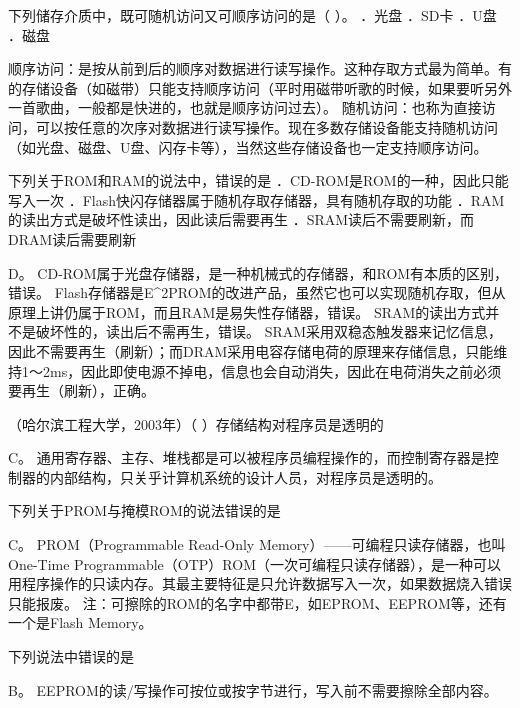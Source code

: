\question 下列储存介质中，既可随机访问又可顺序访问的是（ ）。 ．光盘 ．SD卡
．U盘 ．磁盘
\par{}
\begin{solution}顺序访问：是按从前到后的顺序对数据进行读写操作。这种存取方式最为简单。有的存储设备（如磁带）只能支持顺序访问（平时用磁带听歌的时候，如果要听另外一首歌曲，一般都是快进的，也就是顺序访问过去）。
随机访问：也称为直接访问，可以按任意的次序对数据进行读写操作。现在多数存储设备能支持随机访问（如光盘、磁盘、U盘、闪存卡等），当然这些存储设备也一定支持顺序访问。
\end{solution}
\question 下列关于ROM和RAM的说法中，错误的是
．CD-ROM是ROM的一种，因此只能写入一次
．Flash快闪存储器属于随机存取存储器，具有随机存取的功能
．RAM的读出方式是破坏性读出，因此读后需要再生
．SRAM读后不需要刷新，而DRAM读后需要刷新
\par{}
\begin{solution}D。
CD-ROM属于光盘存储器，是一种机械式的存储器，和ROM有本质的区别，错误。
Flash存储器是E\^{}2PROM的改进产品，虽然它也可以实现随机存取，但从原理上讲仍属于ROM，而且RAM是易失性存储器，错误。
SRAM的读出方式并不是破坏性的，读出后不需再生，错误。
SRAM采用双稳态触发器来记忆信息，因此不需要再生（刷新）；而DRAM采用电容存储电荷的原理来存储信息，只能维持1～2ms，因此即使电源不掉电，信息也会自动消失，因此在电荷消失之前必须要再生（刷新），正确。
\end{solution}
\question （哈尔滨工程大学，2003年）（ ）存储结构对程序员是透明的
\par{}
\begin{solution}C。
通用寄存器、主存、堆栈都是可以被程序员编程操作的，而控制寄存器是控制器的内部结构，只关乎计算机系统的设计人员，对程序员是透明的。
\end{solution}
\question 下列关于PROM与掩模ROM的说法错误的是
\par{}
\begin{solution}C。 PROM（Programmable Read-Only
Memory）------可编程只读存储器，也叫One-Time
Programmable（OTP）ROM（一次可编程只读存储器），是一种可以用程序操作的只读内存。其最主要特征是只允许数据写入一次，如果数据烧入错误只能报废。
注：可擦除的ROM的名字中都带E，如EPROM、EEPROM等，还有一个是Flash
Memory。
\end{solution}
\question 下列说法中错误的是
\par{}
\begin{solution}B。 EEPROM的读/写操作可按位或按字节进行，写入前不需要擦除全部内容。
\end{solution}

